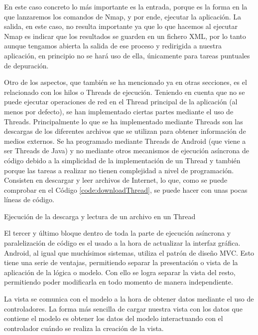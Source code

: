 En este caso concreto lo más importante es la entrada, porque es la forma en la que lanzaremos los comandos de Nmap, y por ende, ejecutar la aplicación. La salida, en este caso, no resulta importante ya que lo que hacemos al ejecutar Nmap es indicar que los resultados se guarden en un fichero XML, por lo tanto aunque tengamos abierta la salida de ese proceso y redirigida a nuestra aplicación, en principio no se hará uso de ella, únicamente para tareas puntuales de depuración.

Otro de los aspectos, que también se ha mencionado ya en otras secciones, es el relacionado con los hilos o Threads de ejecución. Teniendo en cuenta que no se puede ejecutar operaciones de red en el Thread principal de la aplicación (al menos por defecto), se han implementado ciertas partes mediante el uso de Threads. Principalmente lo que se ha implementado mediante Threads son las descargas de los diferentes archivos que se utilizan para obtener información de medios externos. Se ha programado mediante Threads de Android (que viene a ser Threads de Java) y no mediante otros mecanismos de ejecución asíncrona de código debido a la simplicidad de la implementación de un Thread y también porque las tareas a realizar no tienen complejidad a nivel de programación. Consisten en descargar y leer archivos de Internet, lo que, como se puede comprobar en el Código \ref{code:downloadThread}, se puede hacer con unas pocas líneas de código.

\begin{code}
	\caption{Ejecución de la descarga y lectura de un archivo en un Thread}
	\label{code:downloadThread}
	
\end{code}

El tercer y último bloque dentro de toda la parte de ejecución asíncrona y paralelización de código es el usado a la hora de actualizar la interfaz gráfica. Android, al igual que muchísimos sistemas, utiliza el patrón de diseño MVC. Esto tiene una serie de ventajas, permitiendo separar la presentación o vista de la aplicación de la lógica o modelo. Con ello se logra separar la vista del resto, permitiendo poder modificarla en todo momento de manera independiente.

La vista se comunica con el modelo a la hora de obtener datos mediante el uso de controladores. La forma más sencilla de cargar nuestra vista con los datos que contiene el modelo es obtener los datos del modelo interactuando con el controlador cuándo se realiza la creación de la vista.

